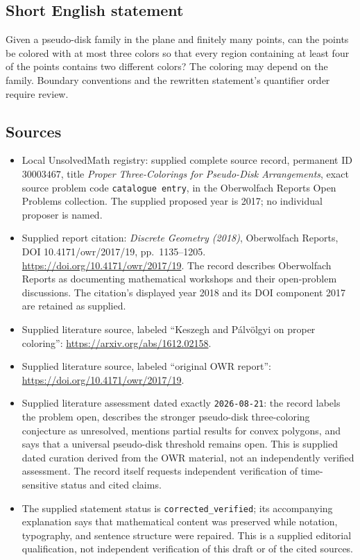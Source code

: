 \documentclass[11pt]{article}
\begin{document}
\subsection{Short English statement}
Given a pseudo-disk family in the plane and finitely many points, can the points be colored with at most three colors so that every region containing at least four of the points contains two different colors? The coloring may depend on the family. Boundary conventions and the rewritten statement's quantifier order require review.
\subsection{Sources}
\begin{itemize}
\item Local UnsolvedMath registry: supplied complete source record, permanent ID \(30003467\), title \emph{Proper Three-Colorings for Pseudo-Disk Arrangements}, exact source problem code \texttt{catalogue entry}, in the Oberwolfach Reports Open Problems collection. The supplied proposed year is 2017; no individual proposer is named.
\item Supplied report citation: \emph{Discrete Geometry (2018)}, Oberwolfach Reports, DOI 10.4171/owr/2017/19, pp.\ 1135--1205. \url{https://doi.org/10.4171/owr/2017/19}. The record describes Oberwolfach Reports as documenting mathematical workshops and their open-problem discussions. The citation's displayed year 2018 and its DOI component 2017 are retained as supplied.
\item Supplied literature source, labeled ``Keszegh and P\'alv\"olgyi on proper coloring'': \url{https://arxiv.org/abs/1612.02158}.
\item Supplied literature source, labeled ``original OWR report'': \url{https://doi.org/10.4171/owr/2017/19}.
\item Supplied literature assessment dated exactly \texttt{2026-08-21}: the record labels the problem open, describes the stronger pseudo-disk three-coloring conjecture as unresolved, mentions partial results for convex polygons, and says that a universal pseudo-disk threshold remains open. This is supplied dated curation derived from the OWR material, not an independently verified assessment. The record itself requests independent verification of time-sensitive status and cited claims.
\item The supplied statement status is \texttt{corrected\_verified}; its accompanying explanation says that mathematical content was preserved while notation, typography, and sentence structure were repaired. This is a supplied editorial qualification, not independent verification of this draft or of the cited sources.
\end{itemize}
\end{document}
